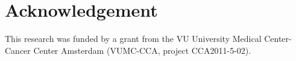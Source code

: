 \documentclass[a4paper]{article}
\begin{document}
\newpage






\newpage
\section*{Acknowledgement}
This research was funded by a grant from the VU University Medical Center-Cancer Center Amsterdam (VUMC-CCA, project CCA2011-5-02).

\setlength{\bibsep}{2pt}


% 
% 
\end{document}
